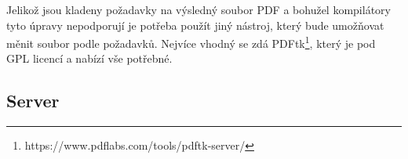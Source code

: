 Jelikož jsou kladeny požadavky na výsledný soubor PDF a bohužel kompilátory tyto úpravy nepodporují je potřeba použít jiný nástroj, který bude umožňovat měnit soubor podle požadavků. Nejvíce vhodný se zdá PDFtk\footnote{https://www.pdflabs.com/tools/pdftk-server/}, který je pod GPL licencí a nabízí vše potřebné. 

\subsection{Server}




